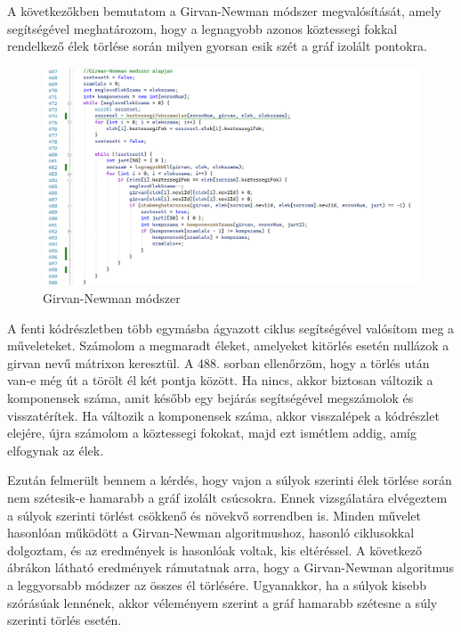 A következőkben bemutatom a Girvan-Newman módszer megvalósítását, amely segítségével meghatározom, hogy a legnagyobb azonos köztessegi fokkal rendelkező élek törlése során milyen gyorsan esik szét a gráf izolált pontokra.


\begin{figure}[h]
    \centering
    \includegraphics[scale=0.8]{images/girvan}
    \caption{Girvan-Newman módszer}
    \label{fig:enter-label}
\end{figure}

A fenti kódrészletben több egymásba ágyazott ciklus segítségével valósítom meg a műveleteket. Számolom a megmaradt éleket, amelyeket kitörlés esetén nullázok a girvan nevű mátrixon keresztül. A 488. sorban ellenőrzöm, hogy a törlés után van-e még út a törölt él két pontja között. Ha nincs, akkor biztosan változik a komponensek száma, amit később egy bejárás segítségével megszámolok és visszatérítek. Ha változik a komponensek száma, akkor visszalépek a kódrészlet elejére, újra számolom a köztessegi fokokat, majd ezt ismétlem addig, amíg elfogynak az élek.

Ezután felmerült bennem a kérdés, hogy vajon a súlyok szerinti élek törlése során nem szétesik-e hamarabb a gráf izolált csúcsokra. Ennek vizsgálatára elvégeztem a súlyok szerinti törlést csökkenő és növekvő sorrendben is. Minden művelet hasonlóan működött a Girvan-Newman algoritmushoz, hasonló ciklusokkal dolgoztam, és az eredmények is hasonlóak voltak, kis eltéréssel. A következő ábrákon látható eredmények rámutatnak arra, hogy a Girvan-Newman algoritmus a leggyorsabb módszer az összes él törlésére. Ugyanakkor, ha a súlyok kisebb szórásúak lennének, akkor véleményem szerint a gráf hamarabb szétesne a súly szerinti törlés esetén.

